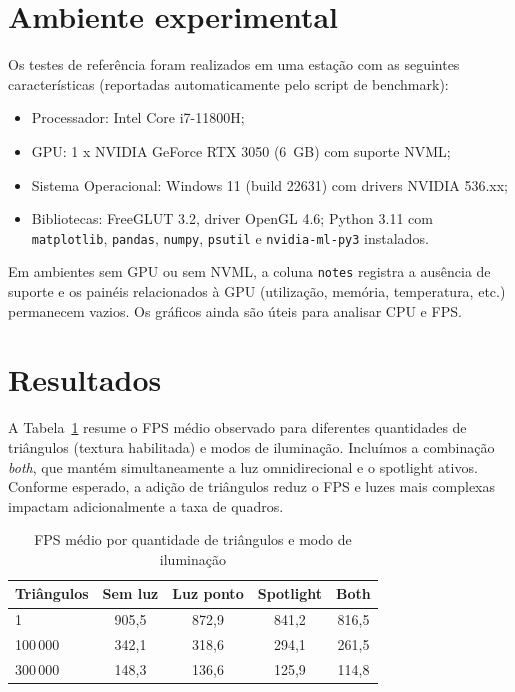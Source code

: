 \documentclass[11pt,a4paper]{article}
\begin{document}
\section{Ambiente experimental}
Os testes de referência foram realizados em uma estação com as seguintes
características (reportadas automaticamente pelo script de benchmark):

\begin{itemize}
  \item Processador: Intel Core i7-11800H;
  \item GPU: 1 x NVIDIA GeForce RTX 3050 (6~GB) com suporte NVML;
  \item Sistema Operacional: Windows 11 (build 22631) com drivers NVIDIA 536.xx;
  \item Bibliotecas: FreeGLUT 3.2, driver OpenGL 4.6; Python 3.11 com
        \texttt{matplotlib}, \texttt{pandas}, \texttt{numpy}, \texttt{psutil} e
        \texttt{nvidia-ml-py3} instalados.
\end{itemize}

Em ambientes sem GPU ou sem NVML, a coluna \texttt{notes} registra a ausência de
suporte e os painéis relacionados à GPU (utilização, memória, temperatura, etc.)
permanecem vazios. Os gráficos ainda são úteis para analisar CPU e FPS.

\section{Resultados}
A Tabela~\ref{tab:fps} resume o FPS médio observado para diferentes quantidades
de triângulos (textura habilitada) e modos de iluminação. Incluímos a combinação
\emph{both}, que mantém simultaneamente a luz omnidirecional e o spotlight
ativos. Conforme esperado, a adição de triângulos reduz o FPS e luzes mais
complexas impactam adicionalmente a taxa de quadros.

\begin{table}[h]
  \centering
  \caption{FPS médio por quantidade de triângulos e modo de iluminação}
  \label{tab:fps}
  \begin{tabular}{lcccc}
    \toprule
    Triângulos & \textbf{Sem luz} & \textbf{Luz ponto} & \textbf{Spotlight} & \textbf{Both} \\
    \midrule
    1       & 905,5 & 872,9 & 841,2 & 816,5 \\
    100\,000 & 342,1 & 318,6 & 294,1 & 261,5 \\
    300\,000 & 148,3 & 136,6 & 125,9 & 114,8 \\
    \bottomrule
  \end{tabular}
\end{table}
\end{document}

